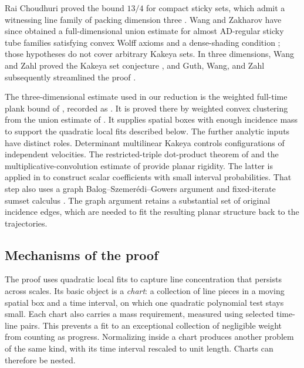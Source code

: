 Rai Choudhuri proved the bound \(13/4\) for compact sticky sets,
which admit a witnessing line family of packing dimension three
\citep{RaiChoudhuriSticky}. Wang and Zakharov have since obtained a
full-dimensional union estimate for almost AD-regular sticky tube
families satisfying convex Wolff axioms and a dense-shading condition
\citep{WangZakharovSticky}; those hypotheses do not cover arbitrary
Kakeya sets. In three dimensions, Wang and Zahl proved the Kakeya
set conjecture \citep{WangZahlThreeDimensional}, and Guth, Wang,
and Zahl subsequently streamlined the proof
\citep{GuthWangZahlStreamlined}.

The three-dimensional estimate used in our reduction is the weighted
full-time plank bound of \citet[Lemma~2.3]{ThreeDimensional}, recorded
as . It is proved there by weighted convex
clustering from the union estimate of
\citet[Theorem~1.1]{GuthWangZahlStreamlined}. It supplies spatial
boxes with enough incidence mass to support the quadratic local
fits described below.
The further analytic inputs have distinct roles. Determinant
multilinear Kakeya \citep{CarberyValdimarsson} controls configurations
of independent velocities. The restricted-triple dot-product
theorem of \citet{WangZahlSticky} and the multiplicative-convolution
estimate of \citet{OrponenDeSaxceShmerkin} provide planar rigidity.
The latter is applied in  to construct
scalar coefficients with small interval probabilities.
That step also uses a graph Balog--Szemer\'edi--Gowers argument and
fixed-iterate sumset calculus
\citep{SudakovSzemerediVu2005,TaoVu2006}. The graph argument retains
a substantial set of original incidence edges, which are needed
to fit the resulting planar structure back to the trajectories.

\subsection{Mechanisms of the proof}

The proof uses quadratic local fits to capture line concentration
that persists across scales. Its basic object is a \emph{chart}:
a collection of line pieces in a moving spatial box and a time
interval, on which one quadratic polynomial test stays small.
Each chart also carries a mass requirement, measured using selected
time-line pairs. This prevents a fit to an exceptional collection of
negligible weight from counting as progress. Normalizing inside a
chart produces another problem of the same kind, with its time
interval rescaled to unit length. Charts can therefore be nested.

